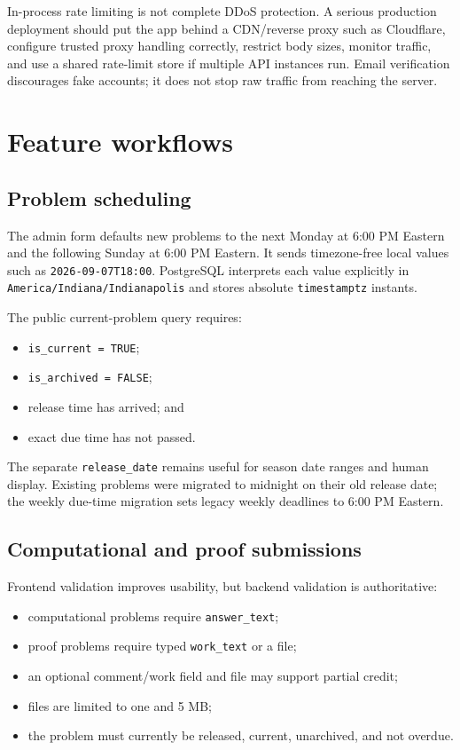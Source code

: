 \documentclass[11pt,oneside]{book}
\newcommand{\code}[1]{\texttt{#1}}
\begin{document}
\begin{warningbox}
In-process rate limiting is not complete DDoS protection. A serious production deployment should put the app behind a CDN/reverse proxy such as Cloudflare, configure trusted proxy handling correctly, restrict body sizes, monitor traffic, and use a shared rate-limit store if multiple API instances run. Email verification discourages fake accounts; it does not stop raw traffic from reaching the server.
\end{warningbox}

\chapter{Feature workflows}

\section{Problem scheduling}
The admin form defaults new problems to the next Monday at 6:00 PM Eastern and the following Sunday at 6:00 PM Eastern. It sends timezone-free local values such as \code{2026-09-07T18:00}. PostgreSQL interprets each value explicitly in \code{America/Indiana/Indianapolis} and stores absolute \code{timestamptz} instants.

The public current-problem query requires:
\begin{itemize}
  \item \code{is\_current = TRUE};
  \item \code{is\_archived = FALSE};
  \item release time has arrived; and
  \item exact due time has not passed.
\end{itemize}

The separate \code{release\_date} remains useful for season date ranges and human display. Existing problems were migrated to midnight on their old release date; the weekly due-time migration sets legacy weekly deadlines to 6:00 PM Eastern.

\section{Computational and proof submissions}
Frontend validation improves usability, but backend validation is authoritative:
\begin{itemize}
  \item computational problems require \code{answer\_text};
  \item proof problems require typed \code{work\_text} or a file;
  \item an optional comment/work field and file may support partial credit;
  \item files are limited to one and 5 MB;
  \item the problem must currently be released, current, unarchived, and not overdue.
\end{itemize}
\end{document}
